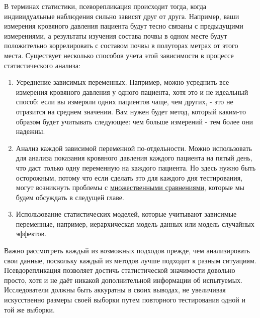В терминах статистики, псеворепликация происходит тогда, когда индивидуальные наблюдения сильно зависят друг от друга. Например, ваши измерения кровяного давления пациента будут тесно связаны с предыдущими измерениями, а результаты изучения состава почвы в одном месте будут положительно коррелировать с составом почвы в полуторах метрах от этого места. Существует несколько способов учета этой зависимости в процессе статистического анализа:

\begin{enumerate}
	\item Усреднение зависимых переменных. Например, можно усреднить все измерения кровяного давления у одного пациента, хотя это и не идеальный способ: если вы измеряли одних пациентов чаще, чем других, - это не отразится на среднем значении. Вам нужен будет метод, который каким-то образом будет учитывать следующее: чем больше измерений - тем более они надежны.
	\item Анализ каждой зависимой переменной по-отдельности. Можно использовать для анализа показания кровяного давления каждого пациента на пятый день, что даст только одну переменную на каждого пациента. Но здесь нужно быть осторожным, потому что если сделать это для каждого дня тестирования, могут возникнуть проблемы с \hyperref[chp5:try-again]{множественными сравнениями}, которые мы будем обсуждать в следущей главе.
	\item Использование статистических моделей, которые учитывают зависимые переменные, например, иерархическая модель данных или модель случайных эффектов.
\end{enumerate}  


Важно рассмотреть каждый из возможных подходов прежде, чем анализировать свои данные, поскольку каждый из методов лучше подходит к разным ситуациям. Псевдорепликация позволяет достичь статистической значимости довольно просто, хотя и не даёт никакой дополнительной информации об испытуемых. Исследователи должны быть аккуратны в своих выводах, не увеличивая искусственно размеры своей выборки путем повторного тестирования одной и той же выборки.